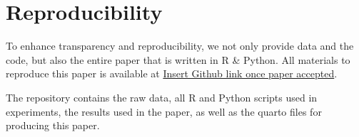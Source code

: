 \documentclass[
  authoryear,
  preprint,
  3p]{elsarticle}
\begin{document}
\section*{Reproducibility}\label{reproducibility}

To enhance transparency and reproducibility, we not only provide data
and the code, but also the entire paper that is written in R \& Python.
All materials to reproduce this paper is available at
\href{Insert\%20Github\%20link\%20once\%20paper\%20accepted}{Insert
Github link once paper accepted}.

The repository contains the raw data, all R and Python scripts used in
experiments, the results used in the paper, as well as the quarto files
for producing this paper.


\renewcommand\refname{References}
  
\end{document}
